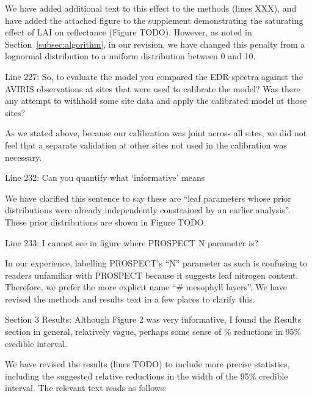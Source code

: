We have added additional text to this effect to the methods (lines XXX), and have added the attached figure to the supplement demonstrating the saturating effect of LAI on reflectance (Figure TODO).
However, as noted in Section~\ref{subsec:algorithm}, in our revision, we have changed this penalty from a lognormal distribution to a uniform distribution between 0 and 10.

\begin{reviewer}
  Line 227: So, to evaluate the model you compared the EDR-spectra against the AVIRIS observations at sites that were used to calibrate the model? Was there any attempt to withhold some site data and apply the calibrated model at those sites?
\end{reviewer}

As we stated above, because our calibration was joint across all sites, we did not feel that a separate validation at other sites not used in the calibration was necessary.

\begin{reviewer}
  Line 232: Can you quantify what ‘informative’ means
\end{reviewer}

We have clarified this sentence to say these are ``leaf parameters whose prior distributions were already independently constrained by an earlier analysis''. These prior distributions are shown in Figure TODO.

\begin{reviewer}
  Line 233: I cannot see in figure where PROSPECT N parameter is?
\end{reviewer}

In our experience, labelling PROSPECT’s ``N'' parameter as such is confusing to readers unfamiliar with PROSPECT because it suggests leaf nitrogen content.
Therefore, we prefer the more explicit name ``\# mesophyll layers''.
We have revised the methods and results text in a few places to clarify this.

\begin{reviewer}
  Section 3 Results: Although Figure 2 was very informative, I found the Results section in general, relatively vague, perhaps some sense of \% reductions in 95\% credible interval.
\end{reviewer}

We have revised the results (lines TODO) to include more precise statistics, including the suggested relative reductions in the width of the 95\% credible interval.
The relevant text reads as follows:

